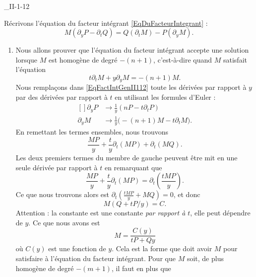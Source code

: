 \begin{corrige}{_II-1-12}

Récrivons l'équation du facteur intégrant \eqref{EqDuFacteurIntegrant} :
\begin{equation}		\label{EqFactIntGenII112}
	M(\partial_yP-\partial_tQ)=Q(\partial_tM)-P(\partial_yM).
\end{equation}

\begin{enumerate}

\item
Nous allons prouver que l'équation du facteur intégrant accepte une solution lorsque $M$ est homogène de degré $-(n+1)$, c'est-à-dire quand $M$ satisfait l'équation
\begin{equation}
	t\partial_tM+y\partial_yM=-(n+1)M.
\end{equation}
Nous remplaçons dans \eqref{EqFactIntGenII112} toute les dérivées par rapport à $y$ par des dérivées par rapport à $t$ en utilisant les formules d'Euler :
\begin{equation}
	\begin{aligned}[]
		\partial_yP	&\to \frac{1}{ y }(nP-t\partial_tP)\\
		\partial_yM	&\to \frac{1}{ y }\big( -(n+1)M-t\partial_tM \big).
	\end{aligned}
\end{equation}
En remettant les termes ensembles, nous trouvons
\begin{equation}
	\frac{ MP }{ y }+\frac{ t }{ y }\partial_t(MP)+\partial_t(MQ).
\end{equation}
Les deux premiers termes du membre de gauche peuvent être mit en une seule dérivée par rapport à $t$ en remarquant que
\begin{equation}
	\frac{ MP }{ y }+\frac{ t }{ y }\partial_t(MP)=\partial_t\left( \frac{ tMP }{ y } \right).
\end{equation}
Ce que nous trouvons alors est $\partial_t\left( \frac{ tMP }{ y }+MQ \right)=0$, et donc
\begin{equation}
 	M(Q+tP/y)=C.
\end{equation}
 Attention : la constante est une constante \emph{par rapport à $t$}, elle peut dépendre de $y$. Ce que nous avons est
\begin{equation}
	M=\frac{ C(y) }{ tP+Qy }
\end{equation}
où $C(y)$ est une fonction de $y$. Cela est la forme que doit avoir $M$ pour satisfaire à l'équation du facteur intégrant. Pour que $M$ soit, de plus homogène de degré $-(m+1)$, il faut en plus que

\end{enumerate}
\end{corrige}

